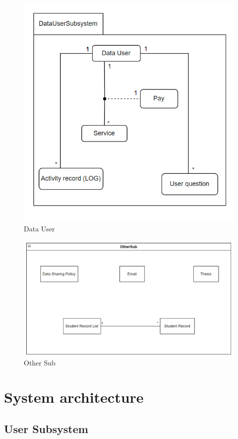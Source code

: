 \begin{figure}[H]
    \centering
    \includegraphics[width=0.75\linewidth]{picture/2-3/2-3-3.jpg}
    \caption{Data User}
    \label{fig:enter-label}
\end{figure}

\begin{figure}[H]
    \centering
    \includegraphics[width=0.75\linewidth]{picture/2-3/2-3-4.png}
    \caption{Other Sub}
    \label{fig:enter-label}
\end{figure}


\chapter{System architecture}

\section{User Subsystem}

